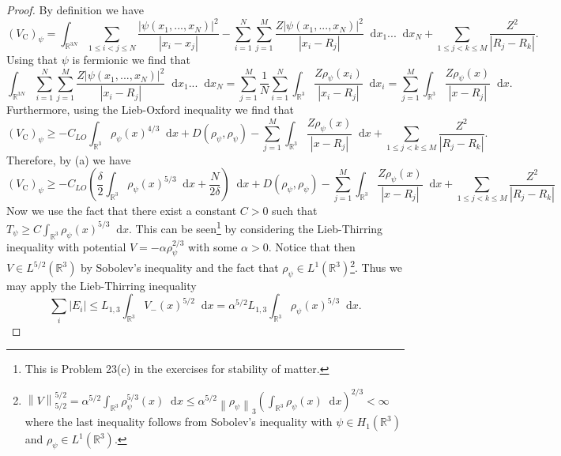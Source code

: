 \documentclass[a4paper,11pt]{article}
\newcommand{\norm}[1]{\left\lVert #1 \right\rVert}
\newcommand{\abs}[1]{\left\lvert #1 \right\rvert}
\newcommand*\diff{\mathop{}\!\mathrm{d}}
\newcommand{\R}{\mathbb{R}}
\numberwithin{equation}{section}
\begin{document}
\begin{proof}
	By definition we have \begin{equation}
	(V_\text{C})_{\psi}=\int_{\R^{3N}}\sum_{1\leq i<j\leq N}\frac{\abs{\psi(x_1,...,x_N)}^2}{\abs{x_i-x_j}}-\sum_{i=1}^{N}\sum_{j=1}^{M}\frac{Z\abs{\psi(x_1,...,x_N)}^2}{\abs{x_i-R_j}}\diff x_1 ...\diff x_N+\sum_{1\leq j< k\leq M}\frac{Z^2}{\abs{R_j-R_k}}.
	\end{equation}
	Using that $ \psi $ is fermionic we find that \begin{equation}
	\int_{\R^{3N}}\sum_{i=1}^{N}\sum_{j=1}^{M}\frac{Z\abs{\psi(x_1,...,x_N)}^2}{\abs{x_i-R_j}}\diff x_1 ...\diff x_N=\sum_{j=1}^{M}\frac{1}{N}\sum_{i=1}^{N}\int_{\R^3}\frac{Z\rho_\psi(x_i)}{\abs{x_i-R_j}}\diff x_i=\sum_{j=1}^{M}\int_{\R^3}\frac{Z\rho_\psi(x)}{\abs{x-R_j}}\diff x.
	\end{equation}
	Furthermore, using the Lieb-Oxford inequality we find that \begin{equation}
	(V_{\text{C}})_{\psi}\geq -C_{LO}\int_{\R^3}\rho_{\psi}(x)^{4/3} \diff x+D(\rho_\psi,\rho_\psi)-\sum_{j=1}^{M}\int_{\R^3}\frac{Z\rho_\psi(x)}{\abs{x-R_j}}\diff x+\sum_{1\leq j< k\leq M}\frac{Z^2}{\abs{R_j-R_k}}.
	\end{equation}
	Therefore, by (a) we have \begin{equation}\label{CoulombEst1}
	(V_{\text{C}})_{\psi}\geq -C_{LO}\left(\frac{\delta}{2}\int_{\R^3}\rho_{\psi}(x)^{5/3}\diff x+\frac{N}{2\delta}\right) \diff x+D(\rho_\psi,\rho_\psi)-\sum_{j=1}^{M}\int_{\R^3}\frac{Z\rho_\psi(x)}{\abs{x-R_j}}\diff x+\sum_{1\leq j< k\leq M}\frac{Z^2}{\abs{R_j-R_k}}
	\end{equation}
	Now we use the fact that there exist a constant $ C>0 $ such that $ T_\psi\geq C\int_{\R^3}\rho_\psi(x)^{5/3}\diff x $. This can be seen\footnote{This is Problem 23(c) in the exercises for stability of matter.} by considering the Lieb-Thirring inequality with potential $ V=-\alpha\rho_\psi^{2/3} $ with some $ \alpha>0 $. Notice that then $ V\in L^{5/2}(\R^3) $ by Sobolev's inequality and the fact that $ \rho_\psi\in L^{1}(\R^3) $\footnote{$ \norm{V}_{5/2}^{5/2}=\alpha^{5/2}\int_{\R^3}\rho_\psi^{5/3}(x) \diff x \leq \alpha^{5/2}\norm{\rho_\psi}_3\left(\int_{\R^3} \rho_\psi(x) \diff x\right)^{2/3}<\infty $ where the last inequality follows from Sobolev's inequality with $ \psi\in H_1(\R^3) $ and $ \rho_\psi\in L^1(\R^3) $.}. Thus we may apply the Lieb-Thirring inequality \begin{equation}
	\sum_{i}\abs{E_i}\leq L_{1,3}\int_{\R^3}V_{-}(x)^{5/2}\diff x=\alpha^{5/2}L_{1,3}\int_{\R^3} \rho_\psi(x)^{5/3}\diff x.

\end{equation}
\end{proof}
\end{document}
